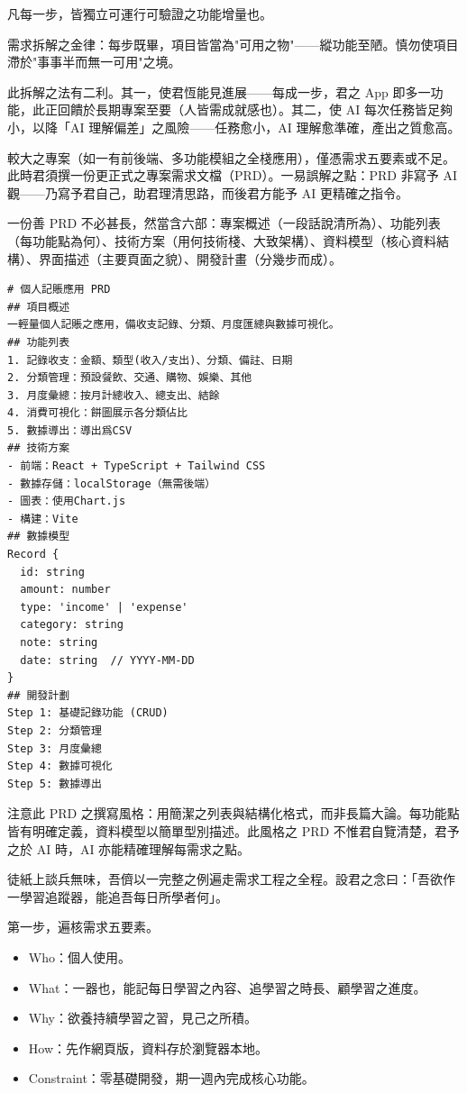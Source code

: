 凡每一步，皆獨立可運行可驗證之功能增量也。

需求拆解之金律：每步既畢，項目皆當為"可用之物"——縱功能至陋。慎勿使項目滯於"事事半而無一可用"之境。

此拆解之法有二利。其一，使君恆能見進展——每成一步，君之 App 即多一功能，此正回饋於長期專案至要（人皆需成就感也）。其二，使 AI 每次任務皆足夠小，以降「AI 理解偏差」之風險——任務愈小，AI 理解愈準確，產出之質愈高。


較大之專案（如一有前後端、多功能模組之全棧應用），僅憑需求五要素或不足。此時君須撰一份更正式之專案需求文檔（PRD）。一易誤解之點：PRD 非寫予 AI 觀——乃寫予君自己，助君理清思路，而後君方能予 AI 更精確之指令。

一份善 PRD 不必甚長，然當含六部：專案概述（一段話說清所為）、功能列表（每功能點為何）、技術方案（用何技術棧、大致架構）、資料模型（核心資料結構）、界面描述（主要頁面之貌）、開發計畫（分幾步而成）。

\begin{lstlisting}
# 個人記賬應用 PRD
## 項目概述
一輕量個人記賬之應用，備收支記錄、分類、月度匯總與數據可視化。
## 功能列表
1. 記錄收支：金額、類型(收入/支出)、分類、備註、日期
2. 分類管理：預設餐飲、交通、購物、娛樂、其他
3. 月度彙總：按月計總收入、總支出、結餘
4. 消費可視化：餅圖展示各分類佔比
5. 數據導出：導出爲CSV
## 技術方案
- 前端：React + TypeScript + Tailwind CSS
- 數據存儲：localStorage（無需後端）
- 圖表：使用Chart.js
- 構建：Vite
## 數據模型
Record {
  id: string
  amount: number
  type: 'income' | 'expense'
  category: string
  note: string
  date: string  // YYYY-MM-DD
}
## 開發計劃
Step 1: 基礎記錄功能 (CRUD)
Step 2: 分類管理
Step 3: 月度彙總
Step 4: 數據可視化
Step 5: 數據導出
\end{lstlisting}

注意此 PRD 之撰寫風格：用簡潔之列表與結構化格式，而非長篇大論。每功能點皆有明確定義，資料模型以簡單型別描述。此風格之 PRD 不惟君自覽清楚，君予之於 AI 時，AI 亦能精確理解每需求之點。


徒紙上談兵無味，吾儕以一完整之例遍走需求工程之全程。設君之念曰：「吾欲作一學習追蹤器，能追吾每日所學者何」。

第一步，遍核需求五要素。

\begin{itemize}
  \item Who：個人使用。
  \item What：一器也，能記每日學習之內容、追學習之時長、顧學習之進度。
  \item Why：欲養持續學習之習，見己之所積。
  \item How：先作網頁版，資料存於瀏覽器本地。
  \item Constraint：零基礎開發，期一週內完成核心功能。
\end{itemize}

